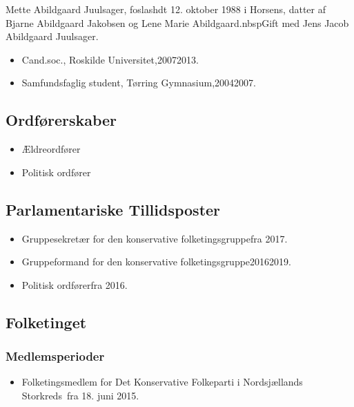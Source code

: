\documentclass[11pt, a4paper]{awesome-cv}
\begin{document}
\makecvheader[R]
\makelettertitle
\begin{cvletter}
Mette Abildgaard Juulsager, foslashdt 12. oktober 1988 i Horsens, datter af Bjarne Abildgaard Jakobsen og Lene Marie Abildgaard.nbspGift med Jens Jacob Abildgaard Juulsager.

\begin{itemize}
\item Cand.soc., Roskilde Universitet,20072013.
\item Samfundsfaglig student, Tørring Gymnasium,20042007.
\end{itemize}
\subsection*{Ordførerskaber}
\begin{itemize}
\item Ældreordfører
\item Politisk ordfører
\end{itemize}
\subsection*{Parlamentariske Tillidsposter}
\begin{itemize}
\item Gruppesekretær for den konservative folketingsgruppefra 2017.
\item Gruppeformand for den konservative folketingsgruppe20162019.
\item Politisk ordførerfra 2016.
\end{itemize}
\subsection*{Folketinget}
\subsubsection*{Medlemsperioder}
\begin{itemize}
\item Folketingsmedlem for Det Konservative Folkeparti i Nordsjællands Storkreds fra 18. juni 2015.
\end{itemize}

\end{cvletter}
\end{document}
